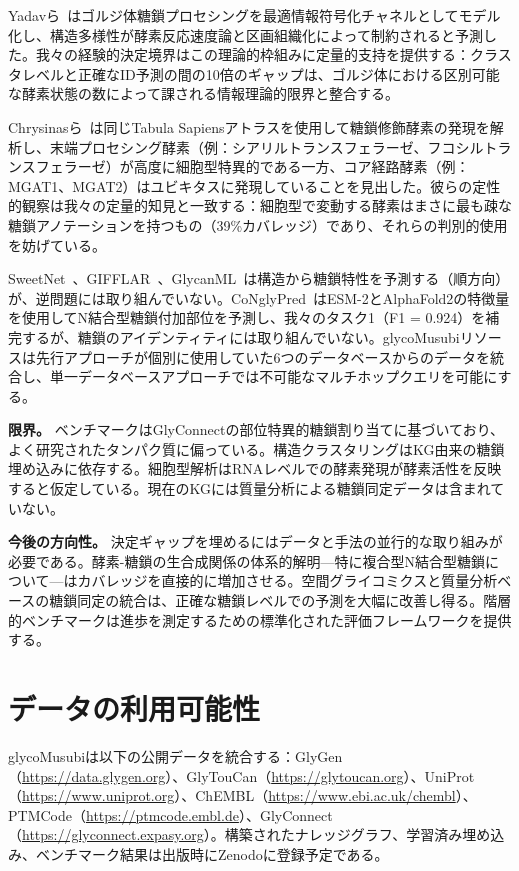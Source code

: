 \documentclass[11pt,a4paper]{ltjsarticle}
\begin{document}
Yadavら~\cite{yadav2022}はゴルジ体糖鎖プロセシングを最適情報符号化チャネルとしてモデル化し、構造多様性が酵素反応速度論と区画組織化によって制約されると予測した。我々の経験的決定境界はこの理論的枠組みに定量的支持を提供する：クラスタレベルと正確なID予測の間の10倍のギャップは、ゴルジ体における区別可能な酵素状態の数によって課される情報理論的限界と整合する。

Chrysinasら~\cite{chrysinas2024}は同じTabula Sapiensアトラスを使用して糖鎖修飾酵素の発現を解析し、末端プロセシング酵素（例：シアリルトランスフェラーゼ、フコシルトランスフェラーゼ）が高度に細胞型特異的である一方、コア経路酵素（例：MGAT1、MGAT2）はユビキタスに発現していることを見出した。彼らの定性的観察は我々の定量的知見と一致する：細胞型で変動する酵素はまさに最も疎な糖鎖アノテーションを持つもの（39\%カバレッジ）であり、それらの判別的使用を妨げている。

SweetNet~\cite{burkholz2022}、GIFFLAR~\cite{thomes2024}、GlycanML~\cite{glyml2024}は構造から糖鎖特性を予測する（順方向）が、逆問題には取り組んでいない。CoNglyPred~\cite{congly2025}はESM-2とAlphaFold2の特徴量を使用してN結合型糖鎖付加部位を予測し、我々のタスク1（F1 = 0.924）を補完するが、糖鎖のアイデンティティには取り組んでいない。glycoMusubiリソースは先行アプローチが個別に使用していた6つのデータベースからのデータを統合し、単一データベースアプローチでは不可能なマルチホップクエリを可能にする。

\textbf{限界。}
ベンチマークはGlyConnectの部位特異的糖鎖割り当てに基づいており、よく研究されたタンパク質に偏っている。構造クラスタリングはKG由来の糖鎖埋め込みに依存する。細胞型解析はRNAレベルでの酵素発現が酵素活性を反映すると仮定している。現在のKGには質量分析による糖鎖同定データは含まれていない。

\textbf{今後の方向性。}
決定ギャップを埋めるにはデータと手法の並行的な取り組みが必要である。酵素-糖鎖の生合成関係の体系的解明---特に複合型N結合型糖鎖について---はカバレッジを直接的に増加させる。空間グライコミクスと質量分析ベースの糖鎖同定の統合は、正確な糖鎖レベルでの予測を大幅に改善し得る。階層的ベンチマークは進歩を測定するための標準化された評価フレームワークを提供する。

\section*{データの利用可能性}

glycoMusubiは以下の公開データを統合する：GlyGen（\url{https://data.glygen.org}）、GlyTouCan（\url{https://glytoucan.org}）、UniProt（\url{https://www.uniprot.org}）、ChEMBL（\url{https://www.ebi.ac.uk/chembl}）、PTMCode（\url{https://ptmcode.embl.de}）、GlyConnect（\url{https://glyconnect.expasy.org}）。構築されたナレッジグラフ、学習済み埋め込み、ベンチマーク結果は出版時にZenodoに登録予定である。
\end{document}
